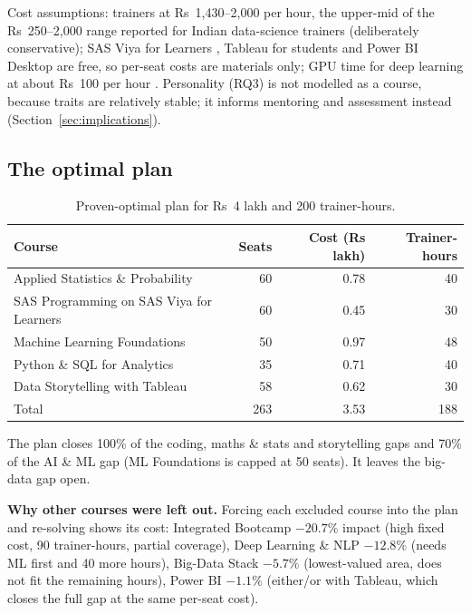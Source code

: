 Cost assumptions: trainers at Rs~1,430--2,000 per hour, the upper-mid of the Rs~250--2,000 range
reported for Indian data-science trainers \citep{knowledgehut} (deliberately conservative); SAS
Viya for Learners \citep{sasvfl}, Tableau for students and Power BI Desktop are free, so per-seat
costs are materials only; GPU time for deep learning at about Rs~100 per hour \citep{gpuindia2026}.
Personality (RQ3) is not modelled as a course, because traits are relatively stable; it informs
mentoring and assessment instead (Section~\ref{sec:implications}).

\subsection{The optimal plan}

\begin{table}[H]\centering\small
\caption{Proven-optimal plan for Rs~4 lakh and 200 trainer-hours.}\label{tab:plan}
\begin{tabular}{@{}l r r r@{}}
\toprule
Course & Seats & Cost (Rs lakh) & Trainer-hours\\
\midrule
Applied Statistics \& Probability & 60 & 0.78 & 40\\
SAS Programming on SAS Viya for Learners & 60 & 0.45 & 30\\
Machine Learning Foundations & 50 & 0.97 & 48\\
Python \& SQL for Analytics & 35 & 0.71 & 40\\
Data Storytelling with Tableau & 58 & 0.62 & 30\\
\midrule
Total & 263 & 3.53 & 188\\
\bottomrule
\end{tabular}
\end{table}


The plan closes 100\% of the coding, maths \& stats and storytelling gaps and 70\% of the AI \& ML
gap (ML Foundations is capped at 50 seats). It leaves the big-data gap open.

\textbf{Why other courses were left out.} Forcing each excluded course into the plan and re-solving
shows its cost: Integrated Bootcamp $-20.7\%$ impact (high fixed cost, 90 trainer-hours, partial
coverage), Deep Learning \& NLP $-12.8\%$ (needs ML first and 40 more hours), Big-Data Stack $-5.7\%$
(lowest-valued area, does not fit the remaining hours), Power BI $-1.1\%$ (either/or with Tableau,
which closes the full gap at the same per-seat cost).

